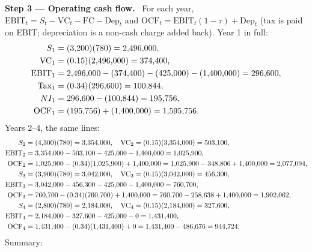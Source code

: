 \documentclass[11pt,a4paper]{article}
\numberwithin{equation}{section}
\newcommand{\step}[2]{\par\medskip\noindent\textbf{Step #1 --- #2.}~}
\begin{document}
\step{3}{Operating cash flow} For each year, $\mathrm{EBIT}_t = S_t - \mathrm{VC}_t - \mathrm{FC} - \mathrm{Dep}_t$
and $\mathrm{OCF}_t = \mathrm{EBIT}_t(1-\tau) + \mathrm{Dep}_t$ (tax is paid on EBIT; depreciation is
a non-cash charge added back). Year 1 in full:
\begin{align}
  S_1 &= (3{,}200)(780) = 2{,}496{,}000, \notag\\
  \mathrm{VC}_1 &= (0.15)(2{,}496{,}000) = 374{,}400, \notag\\
  \mathrm{EBIT}_1 &= 2{,}496{,}000 - (374{,}400) - (425{,}000) - (1{,}400{,}000) = 296{,}600, \notag\\
  \text{Tax}_1 &= (0.34)(296{,}600) = 100{,}844, \notag\\
  NI_1 &= 296{,}600 - (100{,}844) = 195{,}756, \notag\\
  \mathrm{OCF}_1 &= (195{,}756) + (1{,}400{,}000) = 1{,}595{,}756. \label{eq:13ocf1}
\end{align}
Years 2--4, the same lines:
\begin{align}
  S_2 &= (4{,}300)(780) = 3{,}354{,}000, \quad \mathrm{VC}_2 = (0.15)(3{,}354{,}000) = 503{,}100, \notag\\
  \mathrm{EBIT}_2 &= 3{,}354{,}000 - 503{,}100 - 425{,}000 - 1{,}400{,}000 = 1{,}025{,}900, \notag\\
  \mathrm{OCF}_2 &= 1{,}025{,}900 - (0.34)(1{,}025{,}900) + 1{,}400{,}000 = 1{,}025{,}900 - 348{,}806 + 1{,}400{,}000 = 2{,}077{,}094, \notag\\
  S_3 &= (3{,}900)(780) = 3{,}042{,}000, \quad \mathrm{VC}_3 = (0.15)(3{,}042{,}000) = 456{,}300, \notag\\
  \mathrm{EBIT}_3 &= 3{,}042{,}000 - 456{,}300 - 425{,}000 - 1{,}400{,}000 = 760{,}700, \notag\\
  \mathrm{OCF}_3 &= 760{,}700 - (0.34)(760{,}700) + 1{,}400{,}000 = 760{,}700 - 258{,}638 + 1{,}400{,}000 = 1{,}902{,}062, \notag\\
  S_4 &= (2{,}800)(780) = 2{,}184{,}000, \quad \mathrm{VC}_4 = (0.15)(2{,}184{,}000) = 327{,}600, \notag\\
  \mathrm{EBIT}_4 &= 2{,}184{,}000 - 327{,}600 - 425{,}000 - 0 = 1{,}431{,}400, \notag\\
  \mathrm{OCF}_4 &= 1{,}431{,}400 - (0.34)(1{,}431{,}400) + 0 = 1{,}431{,}400 - 486{,}676 = 944{,}724. \notag
\end{align}
Summary:
\end{document}
